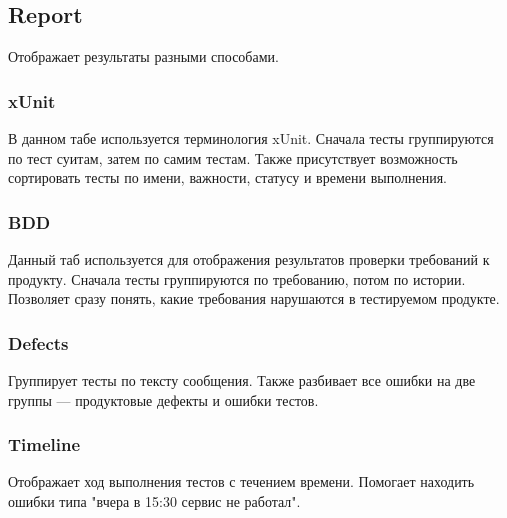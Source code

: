 \subsection{Report}

Отображает результаты разными способами. 

\subsubsection{xUnit}

В данном табе используется терминология xUnit. Сначала тесты группируются по тест суитам, затем по самим тестам. Также присутствует возможность сортировать тесты по имени, важности, статусу и времени выполнения.

\subsubsection{BDD}

Данный таб используется для отображения результатов проверки требований к продукту. Сначала тесты группируются по требованию, потом по истории. Позволяет сразу понять, какие требования нарушаются в тестируемом продукте.

\subsubsection{Defects}

Группирует тесты по тексту сообщения. Также разбивает все ошибки на две группы --- продуктовые дефекты и ошибки тестов. 

\subsubsection{Timeline}

Отображает ход выполнения тестов с течением времени. Помогает находить ошибки типа "вчера в 15:30 сервис не работал".
